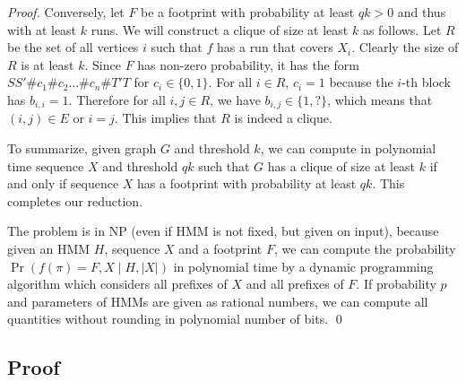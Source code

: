 \begin{notmytext*}
\begin{proof}
Conversely, let $F$ be a footprint with probability at least $qk>0$
and thus with at least $k$ runs. We will construct a clique of size at
least $k$ as follows. Let $R$ be the set of all vertices $i$ such that
$f$ has a run that covers $X_i$. Clearly the size of $R$ is at least
$k$.  Since $F$ has non-zero probability, it has the form
$SS'\#c_1\#c_2\dots\#c_n\#T'T$ for $c_i\in \{0,1\}$. For all $i\in R$,
$c_i=1$ because the $i$-th block has $b_{i,i}=1$. Therefore for all
$i,j\in R$, we have $b_{i,j}\in \{1,?\}$, which means that $(i,j)\in
E$ or $i=j$. This implies that $R$ is indeed a clique.

To summarize, given graph $G$ and threshold $k$, we can compute in
polynomial time sequence $X$ and threshold $qk$ such that $G$ has a
clique of size at least $k$ if and only if sequence $X$ has a
footprint with probability at least $qk$. This completes our reduction.

The problem is in NP (even if HMM is not fixed, but given on input),
because given an HMM $H$, sequence $X$ and a footprint $F$, we can
compute the probability $\Pr(f(\pi)=F,X\mid H,|X|)$ in polynomial time
by a dynamic programming algorithm which considers all prefixes of
$X$ and all prefixes of $F$. If probability $p$ and parameters of HMMs
are given as rational numbers, we can compute all quantities without
rounding in polynomial number of bits. \qed
\end{proof}

\end{notmytext*}

\subsection{Proof}

